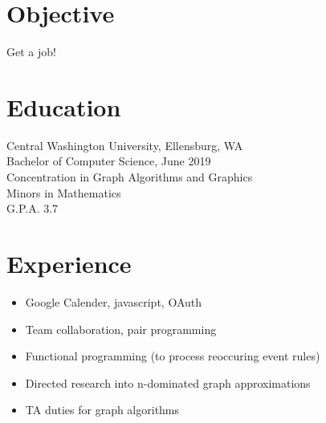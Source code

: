 \documentclass[10pt, a4paper]{article}
\begin{document}

\section*{Objective}
\vspace{-0.05in}
\hspace*{0.1in}
\begin{minipage}{.8\textwidth}
  Get a job!
\end{minipage}
\vspace{-0.1in}

\section*{Education}
\vspace{-0.05in}
\hspace*{0.1in}
\begin{minipage}{.8\textwidth}
  Central Washington University, Ellensburg, WA \\
  Bachelor of Computer Science, June 2019 \\
  Concentration in Graph Algorithms and Graphics \\
  Minors in Mathematics \\
  G.P.A. 3.7
\end{minipage}
\vspace{-0.1in}

\section*{Experience}

\noindent
{
  \hfill
  \hfill
}
\vspace{-0.1in}
\begin{itemize}
  \item Google Calender, javascript, OAuth
        \vspace{-0.1in}
  \item Team collaboration, pair programming
        \vspace{-0.1in}
  \item Functional programming (to process reoccuring event rules)
\end{itemize}
\vspace{-0.05in}

\noindent
{
  \hfill
  \hfill
}
\vspace{-0.1in}
\begin{itemize}
  \item Directed research into n-dominated graph approximations
        \vspace{-0.1in}
  \item TA duties for graph algorithms
\end{itemize}
\vspace{-0.05in}
\end{document}
